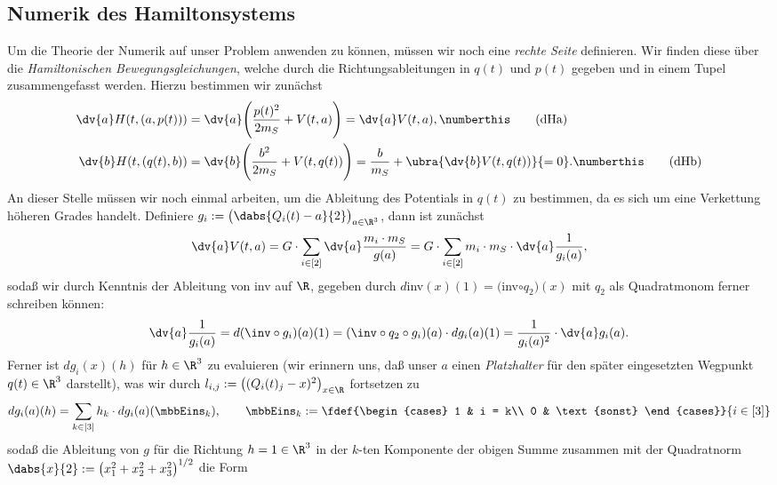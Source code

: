 \documentclass{subfiles}
\begin{document}
    \subsection*{Numerik des Hamiltonsystems}
        Um die Theorie der Numerik auf unser Problem anwenden zu können, müssen wir noch eine \emph{rechte Seite} definieren. Wir finden diese über die \emph{Hamiltonischen Bewegungsgleichungen}, welche durch die Richtungsableitungen in $q(t)$ und $p(t)$ gegeben und in einem Tupel zusammengefasst werden. Hierzu bestimmen wir zunächst
        \begin{align*}
            \dv{a}H(t,(a,p(t))) &= \dv{a}\Biggl(
                \frac{p(t)^2}{2m_S} + V(t,a)
            \Biggr) = \dv{a}V(t,a),\numberthis\label{eq:dHa}\tag{dHa}\\
            \dv{b}H(t,(q(t),b)) &= \dv{b}\Biggl(
                \frac{b^2}{2m_S} + V(t,q(t))
            \Biggr) = \frac{b}{m_S} + \ubra{\dv{b}V(t,q(t))}{=0}.\numberthis\label{eq:dHb}\tag{dHb}
        \end{align*}    
        An dieser Stelle müssen wir noch einmal arbeiten, um die Ableitung des Potentials in $q(t)$ zu bestimmen, da es sich um eine Verkettung höheren Grades handelt. Definiere $g_i:=\bigl(\dabs{Q_i(t)-a}{2}\bigr)_{a\in\R^3}$, dann ist zunächst
        \[
            \dv{a}V(t,a) = G\cdot\sum_{i\in[2]}\dv{a}\frac{m_i\cdot m_S}{g(a)} = G\cdot\sum_{i\in[2]}m_i\cdot m_S\cdot\dv{a}\frac{1}{g_i(a)},
        \]
        sodaß wir durch Kenntnis der Ableitung von inv auf $\R$, gegeben durch $d$inv$(x)(1) = ($inv$\circ q_2)(x)$ mit $q_2$ als Quadratmonom ferner schreiben können:
        \[
            \dv{a}\frac{1}{g_i(a)} = d(\inv\circ g_i)(a)(1) = (\inv\circ q_2\circ g_i)(a)\cdot dg_i(a)(1) = \frac{1}{g_i(a)^2}\cdot \dv{a}g_i(a).  
        \]
        Ferner ist $dg_i(x)(h)$ für $h\in\R^3$ zu evaluieren (wir erinnern uns, daß unser $a$ einen \emph{Platzhalter} für den später eingesetzten Wegpunkt $q(t)\in\R^3$ darstellt), was wir durch $l_{i,j}:=\bigl((Q_i(t)_j - x)^2\bigr)_{x\in\R}$ fortsetzen zu
        \[
            dg_i(a)(h) = \sum_{k\in[3]}h_k\cdot dg_i(a)(\mbbEins_k), \qquad\mbbEins_{k}:=\fdef{\begin{cases}
                1 & i = k\\
                0 & \text{sonst}
            \end{cases}}{i\in[3]}
        \]
        sodaß die Ableitung von $g$ für die Richtung $h=1\in\R^3$ in der $k$-ten Komponente der obigen Summe zusammen mit der Quadratnorm $\dabs{x}{2} := \bigl(x_1^2 + x_2^2 + x_3^2\bigr)^{1/2}$ die Form 
\end{document}
